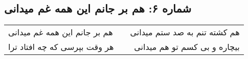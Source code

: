\begin{center}
\section*{شماره ۶: هم بر جانم این همه غم میدانی}
\label{sec:006}
\begin{longtable}{l p{0.5cm} r}
هم بر جانم این همه غم میدانی
&&
هم کشته تنم به صد ستم میدانی
\\
هر وقت بپرسی که چه افتاد ترا
&&
بیچاره و بی کسم تو هم میدانی
\\
\end{longtable}
\end{center}
